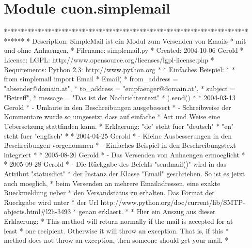 %
%
%


\section{Module cuon.simplemail}

    \label{cuon:simplemail}
******************************************************************************
* Description:  SimpleMail ist ein Modul zum Versenden von Emails *
mit und ohne Anhaengen. * Filename:     simplemail.py * Created:      
2004-10-06 Gerold * License:      LGPL: 
http://www.opensource.org/licenses/lgpl-license.php * Requirements: Python 
2.3:  http://www.python.org * * Einfaches Beispiel: * *   from simplemail 
import Email *   Email( *       from\_address = "absender@domain.at", *
to\_address = "empfaenger@domain.at", *       subject = "Betreff", *       
message = "Das ist der Nachrichtentext" *   ).send() * * 2004-03-13 Gerold 
*   - Umlaute in den Beschreibungen ausgebessert *   - Schreibweise der 
Kommentare wurde so umgesetzt dass auf einfache *     Art und Weise eine 
Uebersetzung stattfinden kann. *     Erklaerung: "de" steht fuer "deutsch" 
*                 "en" steht fuer "englisch" * * 2004-04-25 Gerold *   - 
Kleine Ausbesserungen in den Beschreibungen vorgenommen *   - Einfaches 
Beispiel in den Beschreibungstext integriert * * 2005-08-20 Gerold *   - 
Das Versenden von Anhaengen ermoeglicht * * 2005-09-28 Gerold *   - Die 
Rückgabe des Befehls "sendmail()" wird in das Attribut "statusdict" *     
der Instanz der Klasse "Email" geschrieben. So ist es jetzt auch moeglich, 
*     beim Versenden an mehrere Emailadressen, eine exakte Rueckmeldung 
ueber *     den Versandstatus zu erhalten. Das Format der Rueckgabe wird 
unter *     der Url 
http://www.python.org/doc/current/lib/SMTP-objects.html\#l2h-3493 *     
genau erklaert. * *     Hier ein Auszug aus dieser Erklaerung: *     This 
method will return normally if the mail is accepted for at least *     one 
recipient. Otherwise it will throw an exception. That is, if this *     
method does not throw an exception, then someone should get your mail. *
